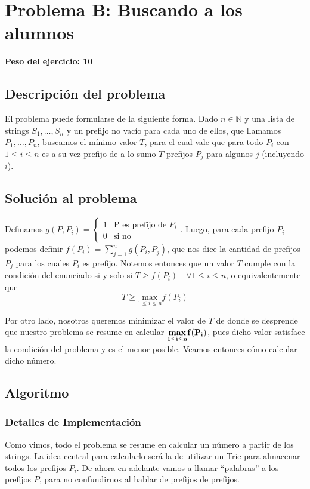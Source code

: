 \newpage{}
\section{Problema B:  Buscando a los alumnos}
\textbf{Peso del ejercicio: 10 }
\subsection{Descripción del problema}
	El problema puede formularse de la siguiente forma. Dado $n \in  \mathbb{N}$ y una lista de strings $S_1, \dots, S_n$ y un prefijo no vacío para cada uno de ellos,  que llamamos $P_1, \dots, P_n$, buscamos el mínimo valor $T$, para el cual vale que para todo $P_i$ con $ 1 \leq i \leq n $ es a su vez prefijo de a lo sumo $T$ prefijos $P_j$ para algunos $j$ (incluyendo $i$).
\subsection{Solución al problema}

	Definamos $g(P,P_i) =
\left\{\begin{matrix}
 1 & \text{P es prefijo de } P_i \\ 
 0 & \text{si no}
\end{matrix}\right.$. Luego, para cada prefijo $P_i$ podemos definir $f(P_i) = \sum\limits_{j = 1}^n g(P_i,P_j)$, que nos dice la cantidad de prefijos $P_j$ para los cuales $P_i$ es prefijo. Notemos entonces que un valor $T$ cumple con la condición del enunciado si y solo si $T \geq f(P_i) \quad \forall 1 \leq i \leq n$, o equivalentemente que $$ \boxed{T \geq \underset{1 \leq i \leq n}{\text{max}} f(P_i) }   $$

	Por otro lado, nosotros queremos minimizar el valor de $T$ de donde se desprende que nuestro problema se resume en calcular $\bf \underset{1 \leq i \leq n}{\textbf{max}} f(P_i)$, pues dicho valor satisface la condición del problema y es el menor posible. Veamos entonces cómo calcular dicho número.


\subsection{Algoritmo}

\subsubsection{Detalles de Implementación}

	Como vimos, todo el problema se resume en calcular un número a partir de los strings. La idea central para calcularlo será la de utilizar un Trie para almacenar todos los prefijos $P_i$. De ahora en adelante vamos a llamar ``palabras'' a los prefijos $P$, para no confundirnos al hablar de prefijos de prefijos.
	
